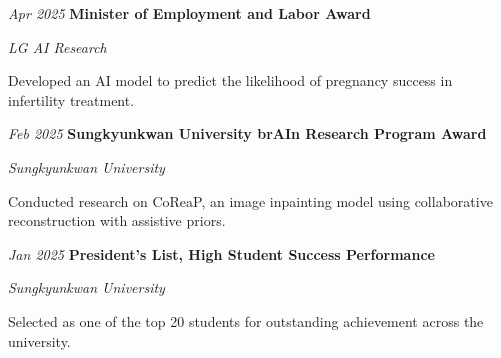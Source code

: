\vspace{0.08cm}

\begin{samepage}
    \begin{twocolentry}{\textit{Apr 2025}}
        \textbf{Minister of Employment and Labor Award}
        \par\textit{LG AI Research}
    \end{twocolentry}
    \begin{onecolentry}
        \begin{highlights}
            \item Developed an AI model to predict the likelihood of pregnancy success in infertility treatment.
        \end{highlights}
    \end{onecolentry}
\end{samepage}

\vspace{0.08cm}

\begin{samepage}
    \begin{twocolentry}{\textit{Feb 2025}}
        \textbf{Sungkyunkwan University brAIn Research Program Award}
        \par\textit{Sungkyunkwan University}
    \end{twocolentry}
    \begin{onecolentry}
        \begin{highlights}
            \item Conducted research on CoReaP, an image inpainting model using collaborative reconstruction with assistive priors.
        \end{highlights}
    \end{onecolentry}
\end{samepage}

\vspace{0.08cm}

\begin{samepage}
    \begin{twocolentry}{\textit{Jan 2025}}
        \textbf{President's List, High Student Success Performance}
        \par\textit{Sungkyunkwan University}
    \end{twocolentry}
    \begin{onecolentry}
        \begin{highlights}
            \item Selected as one of the top 20 students for outstanding achievement across the university.
        \end{highlights}
    \end{onecolentry}
\end{samepage}

